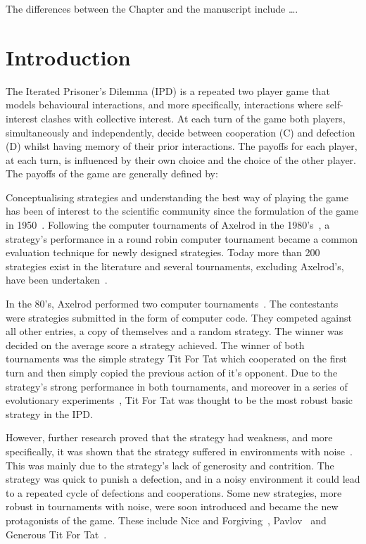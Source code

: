 \hrulefill

The differences between the Chapter and the manuscript include \dots.

\section{Introduction}




The Iterated Prisoner's Dilemma (IPD) is a repeated two player game that models
behavioural interactions, and more specifically, interactions where
self-interest clashes with collective interest. At each turn of the game both
players, simultaneously and independently, decide between cooperation (C) and
defection (D) whilst having memory of their prior interactions. The payoffs for each
player, at each turn, is influenced by their own choice and the choice of the
other player. The payoffs of the game are generally defined by:

Conceptualising strategies and understanding the best way of playing the game
has been of interest to the scientific community since the formulation of the
game in 1950~\cite{Flood1958}. Following the computer tournaments of Axelrod in the
1980's~\cite{Axelrod1980a, Axelrod1980b}, a strategy's performance in a round
robin computer tournament became a common evaluation technique for newly designed
strategies. Today more than 200 strategies exist in the literature and several
tournaments, excluding Axelrod's, have been undertaken~\cite{Bendor1991,
Harper2017, kendall2007iterated, Stephens2002, Stewart2012}.

In the 80's, Axelrod performed two computer tournaments~\cite{Axelrod1980a,
Axelrod1980b}. The contestants were strategies submitted in the form of computer
code. They competed against all other entries, a copy of themselves and a random
strategy. The winner was decided on the average score a strategy achieved. The
winner of both tournaments was the simple strategy Tit For Tat which cooperated
on the first turn and then simply copied the previous action of it's opponent.
Due to the strategy's strong performance in both tournaments, and moreover in a
series of evolutionary experiments~\cite{Axelrod1981}, Tit For Tat was thought
to be the most robust basic strategy in the IPD.

However, further research proved that the strategy had weakness, and more
specifically, it was shown that the strategy suffered in environments with
noise~\cite{Bendor1991, Donninger1986, Molander1985, Hammerstein1984}. This was
mainly due to the strategy's lack of generosity and contrition. The strategy was
quick to punish a defection, and in a noisy environment it could lead to a
repeated cycle of defections and cooperations. Some new strategies, more
robust in tournaments with noise, were soon introduced and became the new
protagonists of the game. These include Nice and Forgiving~\cite{Bendor1991},
Pavlov~\cite{Nowak1993} and Generous Tit For Tat~\cite{Nowak1992}.

